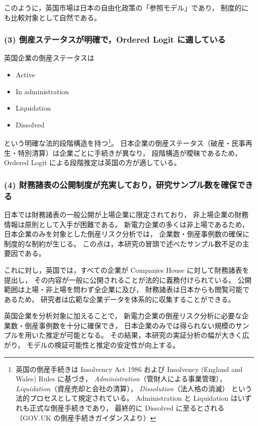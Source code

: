 このように，英国市場は日本の自由化政策の「参照モデル」であり，
制度的にも比較対象として自然である。

\subsubsection{(3) 倒産ステータスが明確で，Ordered Logit に適している}

英国企業の倒産ステータスは

\begin{itemize}
    \item Active
    \item In administration
    \item Liquidation
    \item Dissolved
\end{itemize}

という明確な法的段階構造を持つ\footnote{
英国の倒産手続きは Insolvency Act 1986 および Insolvency (England and Wales) Rules に基づき，
\textit{Administration}（管財人による事業管理），
\textit{Liquidation}（資産売却と会社の清算），
\textit{Dissolution}（法人格の消滅）
という法的プロセスとして規定されている。
Administration と Liquidation はいずれも正式な倒産手続きであり，
最終的に Dissolved に至るとされる（GOV.UK の倒産手続きガイダンスより）%
}。
日本企業の倒産ステータス（破産・民事再生・特別清算）は企業ごとに手続きが異なり，
段階構造が曖昧であるため，Ordered Logit による段階推定は英国の方が適している。

\subsubsection{(4) 財務諸表の公開制度が充実しており，研究サンプル数を確保できる}

日本では財務諸表の一般公開が上場企業に限定されており，
非上場企業の財務情報は原則として入手が困難である。
新電力企業の多くは非上場であるため，
日本企業のみを対象とした倒産リスク分析では，
企業数・倒産事例数の確保に制度的な制約が生じる。
この点は，本研究の冒頭で述べたサンプル数不足の主要因である。

これに対し，英国では，すべての企業が Companies House に対して財務諸表を提出し，
その内容が一般に公開されることが法的に義務付けられている。
公開範囲は上場・非上場を問わず全企業に及び，
財務諸表は日本からも閲覧可能であるため，
研究者は広範な企業データを体系的に収集することができる。

英国企業を分析対象に加えることで，
新電力企業の倒産リスク分析に必要な企業数・倒産事例数を十分に確保でき，
日本企業のみでは得られない規模のサンプルを用いた推定が可能となる。
その結果，本研究の実証分析の幅が大きく広がり，
モデルの検証可能性と推定の安定性が向上する。



